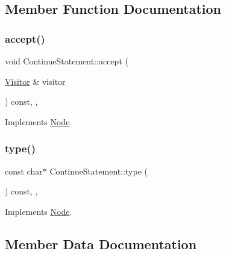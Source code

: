 \subsection{Member Function Documentation}
\mbox{\label{struct_continue_statement_a9288fc77078160a2709a6329f1fe4838}} 
\subsubsection{\texorpdfstring{accept()}{accept()}}
{\footnotesize\ttfamily void Continue\+Statement\+::accept (\begin{DoxyParamCaption}\item[{\hyperlink{struct_visitor}{Visitor} \&}]{visitor }\end{DoxyParamCaption}) const\hspace{0.3cm}{\ttfamily [inline]}, {\ttfamily [override]}, {\ttfamily [virtual]}}



Implements \hyperlink{struct_node_a10bd7af968140bbf5fa461298a969c71}{Node}.

\mbox{\label{struct_continue_statement_a08b73034c5d273c3c4cbad00b252913f}} 
\subsubsection{\texorpdfstring{type()}{type()}}
{\footnotesize\ttfamily const char$\ast$ Continue\+Statement\+::type (\begin{DoxyParamCaption}{ }\end{DoxyParamCaption}) const\hspace{0.3cm}{\ttfamily [inline]}, {\ttfamily [override]}, {\ttfamily [virtual]}}



Implements \hyperlink{struct_node_a82f29420d0a38efcc370352528e94e9b}{Node}.



\subsection{Member Data Documentation}
\mbox{\label{struct_continue_statement_a4bf8883a88736fa6ce4341e9029db194}} 

